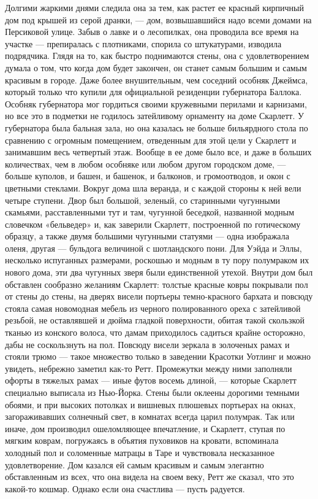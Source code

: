 Долгими жаркими днями следила она за тем, как растет ее красный кирпичный дом под крышей из серой дранки, — дом, возвышавшийся надо всеми домами на Персиковой улице. Забыв о лавке и о лесопилках, она проводила все время на участке — препиралась с плотниками, спорила со штукатурами, изводила подрядчика. Глядя на то, как быстро поднимаются стены, она с удовлетворением думала о том, что когда дом будет закончен, он станет самым большим и самым красивым в городе. Даже более внушительным, чем соседний особняк Джеймса, который только что купили для официальной резиденции губернатора Баллока.
Особняк губернатора мог гордиться своими кружевными перилами и карнизами, но все это в подметки не годилось затейливому орнаменту на доме Скарлетт. У губернатора была бальная зала, но она казалась не больше бильярдного стола по сравнению с огромным помещением, отведенным для этой цели у Скарлетт и занимавшим весь четвертый этаж. Вообще в ее доме было все, и даже в больших количествах, чем в любом особняке или любом другом городском доме, — больше куполов, и башен, и башенок, и балконов, и громоотводов, и окон с цветными стеклами.
Вокруг дома шла веранда, и с каждой стороны к ней вели четыре ступени. Двор был большой, зеленый, со старинными чугунными скамьями, расставленными тут и там, чугунной беседкой, названной модным словечком «бельведер» и, как заверили Скарлетт, построенной по готическому образцу, а также двумя большими чугунными статуями — одна изображала оленя, другая — бульдога величиной с шотландского пони. Для Уэйда и Эллы, несколько испуганных размерами, роскошью и модным в ту пору полумраком их нового дома, эти два чугунных зверя были единственной утехой.
Внутри дом был обставлен сообразно желаниям Скарлетт: толстые красные ковры покрывали пол от стены до стены, на дверях висели портьеры темно-красного бархата и повсюду стояла самая новомодная мебель из черного полированного ореха с затейливой резьбой, не оставлявшей и дюйма гладкой поверхности, обитая такой скользкой тканью из конского волоса, что дамам приходилось садиться крайне осторожно, дабы не соскользнуть на пол. Повсюду висели зеркала в золоченых рамах и стояли трюмо — такое множество только в заведении Красотки Уотлинг и можно увидеть, небрежно заметил как-то Ретт. Промежутки между ними заполняли офорты в тяжелых рамах — иные футов восемь длиной, — которые Скарлетт специально выписала из Нью-Йорка. Стены были оклеены дорогими темными обоями, и при высоких потолках и вишневых плюшевых портьерах на окнах, загораживавших солнечный свет, в комнатах всегда царил полумрак.
Так или иначе, дом производил ошеломляющее впечатление, и Скарлетт, ступая по мягким коврам, погружаясь в объятия пуховиков на кровати, вспоминала холодный пол и соломенные матрацы в Таре и чувствовала несказанное удовлетворение. Дом казался ей самым красивым и самым элегантно обставленным из всех, что она видела на своем веку, Ретт же сказал, что это какой-то кошмар. Однако если она счастлива — пусть радуется.

